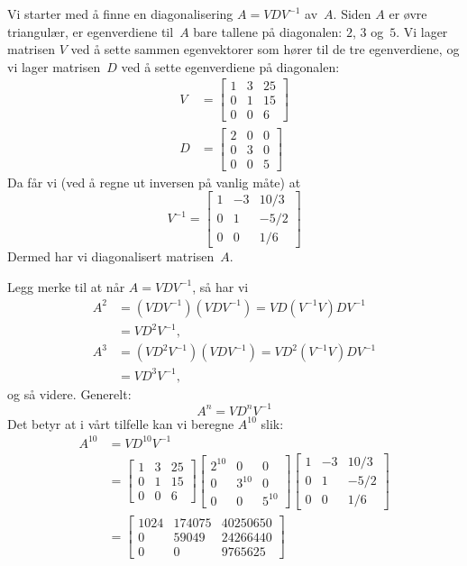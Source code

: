 \begin{losning}
Vi starter med å finne en diagonalisering $A=VDV^{-1}$ av~$A$.  Siden
$A$ er øvre triangulær, er egenverdiene til~$A$ bare tallene på
diagonalen: $2$, $3$ og~$5$.  Vi lager matrisen $V$ ved å sette sammen
egenvektorer som hører til de tre egenverdiene, og vi lager
matrisen~$D$ ved å sette egenverdiene på diagonalen:
\begin{align*}
V &=
\begin{bmatrix}
1 & 3 & 25 \\
0 & 1 & 15 \\
0 & 0 &  6
\end{bmatrix}
\\
D &=
\begin{bmatrix}
2 & 0 & 0 \\
0 & 3 & 0 \\
0 & 0 & 5
\end{bmatrix}
\end{align*}
Da får vi (ved å regne ut inversen på vanlig måte) at
\[
V^{-1} =
\begin{bmatrix}
1 & -3 & 10/3 \\
0 &  1 & -5/2 \\
0 &  0 &  1/6 
\end{bmatrix}
\]
Dermed har vi diagonalisert matrisen~$A$.

Legg merke til at når $A = VDV^{-1}$, så har vi
\begin{align*}
A^2 &= (VDV^{-1})(VDV^{-1}) = VD (V^{-1}V) DV^{-1} \\
    &= V D^2 V^{-1}, \\
A^3 &= (V D^2 V^{-1})(VDV^{-1}) = V D^2 (V^{-1}V) D V^{-1} \\
    &= V D^3 V^{-1},
\end{align*}
og så videre.  Generelt:
\[
A^n = V D^n V^{-1}
\]
Det betyr at i vårt tilfelle kan vi beregne $A^{10}$ slik:
\begin{align*}
A^{10}
&= V D^{10} V^{-1} \\
&=
\begin{bmatrix}
1 & 3 & 25 \\
0 & 1 & 15 \\
0 & 0 &  6
\end{bmatrix}
\begin{bmatrix}
2^{10} & 0      & 0      \\
0      & 3^{10} & 0      \\
0      & 0      & 5^{10}
\end{bmatrix}
\begin{bmatrix}
1 & -3 & 10/3 \\
0 &  1 & -5/2 \\
0 &  0 &  1/6 
\end{bmatrix}
\\
&=
\begin{bmatrix}
1024 & 174075 & 40250650 \\
   0 & 59049  & 24266440 \\
   0 & 0      & 9765625
\end{bmatrix}
\end{align*}
\end{losning}



